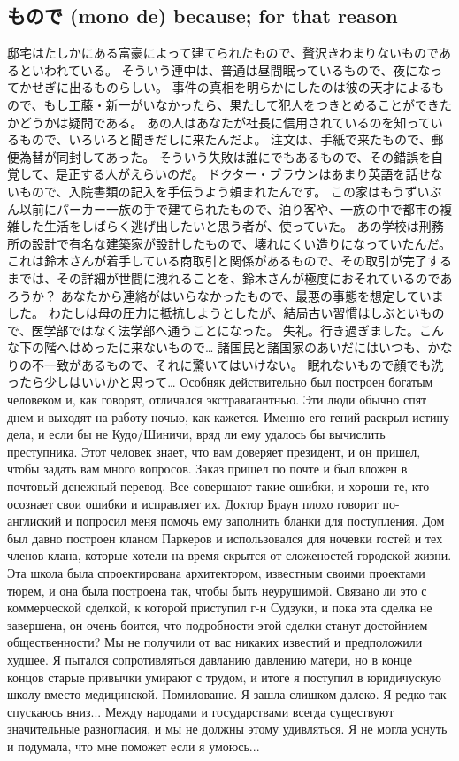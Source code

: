 \subsection{もので (mono de) because; for that reason}

邸宅はたしかにある富豪によって建てられたもので、贅沢きわまりないものであるといわれている。
そういう連中は、普通は昼間眠っているもので、夜になってかせぎに出るものらしい。
事件の真相を明らかにしたのは彼の天才によるもので、もし工藤・新一がいなかったら、果たして犯人をつきとめることができたかどうかは疑問である。
あの人はあなたが社長に信用されているのを知っているもので、いろいろと聞きだしに来たんだよ。
注文は、手紙で来たもので、郵便為替が同封してあった。
そういう失敗は誰にでもあるもので、その錯誤を自覚して、是正する人がえらいのだ。
ドクター・ブラウンはあまり英語を話せないもので、入院書類の記入を手伝うよう頼まれたんです。
この家はもうずいぶん以前にパーカー一族の手で建てられたもので、泊り客や、一族の中で都市の複雑した生活をしばらく逃げ出したいと思う者が、使っていた。
あの学校は刑務所の設計で有名な建築家が設計したもので、壊れにくい造りになっていたんだ。
これは鈴木さんが着手している商取引と関係があるもので、その取引が完了するまでは、その詳細が世間に洩れることを、鈴木さんが極度におそれているのであろうか？
あなたから連絡がはいらなかったもので、最悪の事態を想定していました。
わたしは母の圧力に抵抗しようとしたが、結局古い習慣はしぶといもので、医学部ではなく法学部へ通うことになった。
失礼。行き過ぎました。こんな下の階へはめったに来ないもので…
諸国民と諸国家のあいだにはいつも、かなりの不一致があるもので、それに驚いてはいけない。
眠れないもので顔でも洗ったら少しはいいかと思って…
Особняк действительно был построен богатым человеком и, как говорят, отличался экстравагантнью.
Эти люди обычно спят днем и выходят на работу ночью, как кажется.
Именно его гений раскрыл истину дела, и если бы не Кудо/Шиничи, вряд ли ему удалось бы вычислить преступника.
Этот человек знает, что вам доверяет президент, и он пришел, чтобы задать вам много вопросов.
Заказ пришел по почте и был вложен в почтовый денежный перевод.
Все совершают такие ошибки, и хороши те, кто осознает свои ошибки и исправляет их.
Доктор Браун плохо говорит по-англиский и попросил меня помочь ему заполнить бланки для поступления.
Дом был давно построен кланом Паркеров и использовался для ночевки гостей и тех членов клана, которые хотели на время скрытся от сложеностей городской жизни.
Эта школа была спроектирована архитектором, известным своими проектами тюрем, и она была построена так, чтобы быть неурушимой.
Связано ли это с коммерческой сделкой, к которой приступил г-н Судзуки, и пока эта сделка не завершена, он очень боится, что подробности этой сделки станут достойнием общественности?
Мы не получили от вас никаких известий и предположили худшее.
Я пытался сопротивляться давланию давлению матери, но в конце концов старые привычки умирают с трудом, и итоге я поступил в юридичускую школу вместо медицинской.
Помилование. Я зашла слишком далеко. Я редко так спускаюсь вниз...
Между народами и государствами всегда существуют значительные разногласия, и мы не должны этому удивляться.
Я не могла уснуть и подумала, что мне поможет если я умоюсь...

